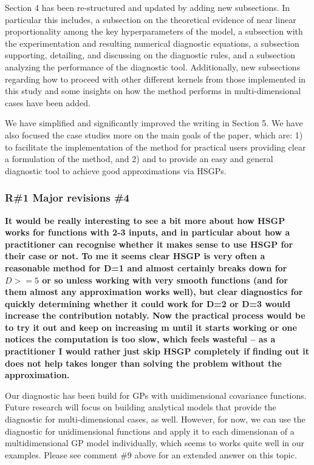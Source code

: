 \documentclass[11pt]{report}
\begin{document}
Section 4 has been re-structured and updated by adding new subsections. In particular this includes, a subsection on the theoretical evidence of near linear proportionality among the key hyperparameters of the model, a subsection with the experimentation and resulting numerical diagnostic equations, a subsection supporting, detailing, and discussing on the diagnostic rules, and a subsection analyzing the performance of the diagnostic tool. Additionally, new subsections regarding how to proceed with other different kernels from those implemented in this study and some insights on how the method performs in multi-dimensional cases have been added.

We have simplified and significantly improved the writing in Section 5. We have also focused the case studies more on the main goals of the paper, which are: 1) to facilitate the implementation of the method for practical users providing clear a formulation of the method, and 2) and to provide an easy and general diagnostic tool to achieve good approximations via HSGPs.
 

\subsubsection*{R\#1 Major revisions \#4}

\textbf{It would be really interesting to see a bit more about how HSGP works for functions with 2-3 inputs, and in particular about how a practitioner can recognise whether it makes sense to use HSGP for their case or not. To me it seems clear HSGP is very often a reasonable method for D=1 and almost certainly breaks down for $D>=5$ or so unless working with very smooth functions (and for them almost any approximation works well), but clear diagnostics for quickly determining whether it could work for D=2 or D=3 would increase the contribution notably. Now the practical process would be to try it out and keep on increasing m until it starts working or one notices the computation is too slow, which feels wasteful -- as a practitioner I would rather just skip HSGP completely if finding out it does not help takes longer than solving the problem without the approximation.}

Our diagnostic has been build for GPs with unidimensional covariance functions. Future research will focus on building analytical models that provide the diagnostic for multi-dimensional cases, as well. However, for now, we can use the diagnostic for unidimensional functions and apply it to each dimensionan of a multidimensional GP model individually, which seems to works quite well in our examples. Please see comment \#9 above for an extended answer on this topic.
\end{document}
